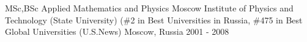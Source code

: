 
\begin{cventries}

  \cvblitz
    {MSc,BSc} %
    {Applied Mathematics and Physics}
    {Moscow Institute of Physics and Technology (State University) (\#2 in Best Universities in Russia, \#475 in Best Global Universities (U.S.News)} %
    {Moscow, Russia} %
    {2001 - 2008} %

\end{cventries}
